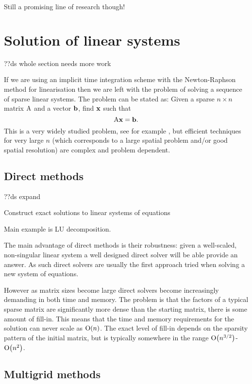Still a promising line of research though!



\section{Solution of linear systems}
\label{sec:solution-lin-sys}

??ds whole section needs more work

If we are using an implicit time integration scheme with the Newton-Raphson method for linearisation then we are left with the problem of solving a sequence of sparse linear systems.
The problem can be stated as: Given a sparse $n \times n $ matrix $\mathrm{A}$ and a vector ${\mathbf{b}}$, find $\mathbf{x}$ such that
\begin{equation}
  \label{eq:linear-system}
  \mathrm{A} \mathbf{x} = {\mathbf{b}}.
\end{equation}
This is a very widely studied problem, see for example \cite{Saad2000}, but efficient techniques for very large $n$ (which corresponds to a large spatial problem and/or good spatial resolution) are complex and problem dependent.


\subsection{Direct methods}
\label{sec:direct-methods}

??ds expand

Construct exact solutions to linear systems of equations

Main example is LU decomposition.

The main advantage of direct methods is their robustness: given a well-scaled, non-singular linear system a well designed direct solver will be able provide an answer.
As such direct solvers are usually the first approach tried when solving a new system of equations.

However as matrix sizes become large direct solvers become increasingly demanding in both time and memory.
The problem is that the factors of a typical sparse matrix are significantly more dense than the starting matrix, \ie there is some amount of fill-in.
This means that the time and memory requirements for the solution can never scale as $\text{O}{\left( n \right)}$.
The exact level of fill-in depends on the sparsity pattern of the initial matrix, but is typically somewhere in the range $\text{O}{\left( n^{3/2} \right)}$-$\text{O}{\left( n^2 \right)}$.


\subsection{Multigrid methods}

